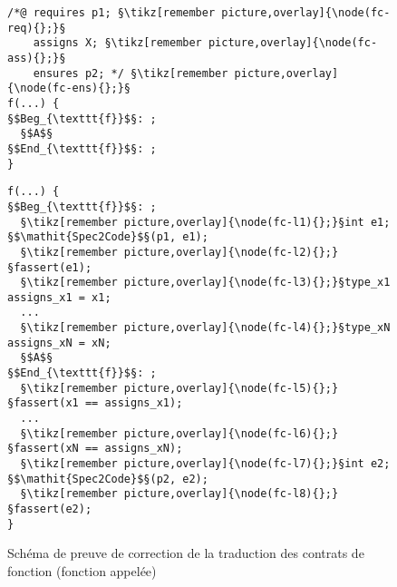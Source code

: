 \begin{figure}[bt]
  \begin{minipage}{0.65\textwidth}
    \begin{lstlisting}[escapechar=§]
/*@ requires p1; §\tikz[remember picture,overlay]{\node(fc-req){};}§
    assigns X; §\tikz[remember picture,overlay]{\node(fc-ass){};}§
    ensures p2; */ §\tikz[remember picture,overlay]{\node(fc-ens){};}§
f(...) {
§$Beg_{\texttt{f}}$§: ;
  §$A$§
§$End_{\texttt{f}}$§: ;
}
    \end{lstlisting}
  \end{minipage}\hfill
  \begin{minipage}{0.49\textwidth}
    \begin{lstlisting}[escapechar=§]
f(...) {
§$Beg_{\texttt{f}}$§: ;
  §\tikz[remember picture,overlay]{\node(fc-l1){};}§int e1; §$\mathit{Spec2Code}$§(p1, e1);
  §\tikz[remember picture,overlay]{\node(fc-l2){};}§fassert(e1);
  §\tikz[remember picture,overlay]{\node(fc-l3){};}§type_x1 assigns_x1 = x1;
  ...
  §\tikz[remember picture,overlay]{\node(fc-l4){};}§type_xN assigns_xN = xN;
  §$A$§
§$End_{\texttt{f}}$§: ;
  §\tikz[remember picture,overlay]{\node(fc-l5){};}§fassert(x1 == assigns_x1);
  ...
  §\tikz[remember picture,overlay]{\node(fc-l6){};}§fassert(xN == assigns_xN);
  §\tikz[remember picture,overlay]{\node(fc-l7){};}§int e2; §$\mathit{Spec2Code}$§(p2, e2);
  §\tikz[remember picture,overlay]{\node(fc-l8){};}§fassert(e2);
}
    \end{lstlisting}
  \end{minipage}
  \caption{Schéma de preuve de correction de la traduction des contrats de
    fonction (fonction appelée)}
  \label{fig:proof-fct-contract-call}
\end{figure}
